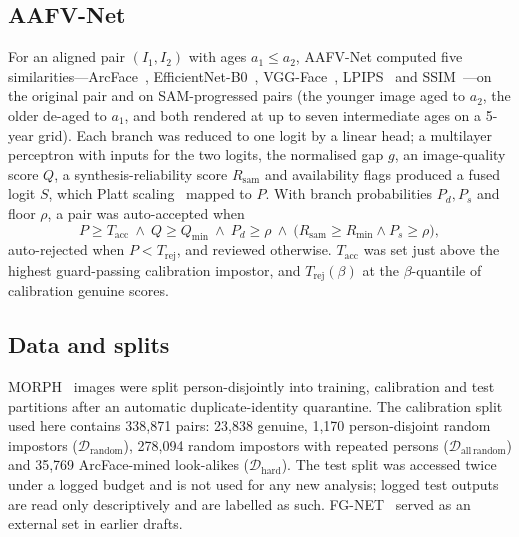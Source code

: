 \documentclass[journal]{IEEEtran}
\begin{document}
\subsection{AAFV-Net}
For an aligned pair $(I_1,I_2)$ with ages $a_1\le a_2$, AAFV-Net computed five similarities---ArcFace~\cite{deng2019arcface}, EfficientNet-B0~\cite{tan2019efficientnet}, VGG-Face~\cite{parkhi2015vgg}, LPIPS~\cite{zhang2018lpips} and SSIM~\cite{wang2004ssim}---on the original pair and on SAM-progressed pairs (the younger image aged to $a_2$, the older de-aged to $a_1$, and both rendered at up to seven intermediate ages on a 5-year grid). Each branch was reduced to one logit by a linear head; a multilayer perceptron with inputs for the two logits, the normalised gap $g$, an image-quality score $Q$, a synthesis-reliability score $R_\mathrm{sam}$ and availability flags produced a fused logit $S$, which Platt scaling~\cite{platt1999} mapped to $P$. With branch probabilities $P_d,P_s$ and floor $\rho$, a pair was auto-accepted when
\begin{equation}
P \ge T_\mathrm{acc}\ \wedge\ Q\ge Q_\mathrm{min}\ \wedge\ P_d\ge\rho\ \wedge\ \big(R_\mathrm{sam}\ge R_\mathrm{min}\wedge P_s\ge\rho\big),
\label{eq:accept}
\end{equation}
auto-rejected when $P<T_\mathrm{rej}$, and reviewed otherwise. $T_\mathrm{acc}$ was set just above the highest guard-passing calibration impostor, and $T_\mathrm{rej}(\beta)$ at the $\beta$-quantile of calibration genuine scores.

\subsection{Data and splits}
MORPH~\cite{ricanek2006morph} images were split person-disjointly into training, calibration and test partitions after an automatic duplicate-identity quarantine. The calibration split used here contains 338,871 pairs: 23,838 genuine, 1,170 person-disjoint random impostors ($\mathcal{D}_\mathrm{random}$), 278,094 random impostors with repeated persons ($\mathcal{D}_\mathrm{all\,random}$) and 35,769 ArcFace-mined look-alikes ($\mathcal{D}_\mathrm{hard}$). The test split was accessed twice under a logged budget and is not used for any new analysis; logged test outputs are read only descriptively and are labelled as such. FG-NET~\cite{lanitis2002fgnet} served as an external set in earlier drafts.
\end{document}
